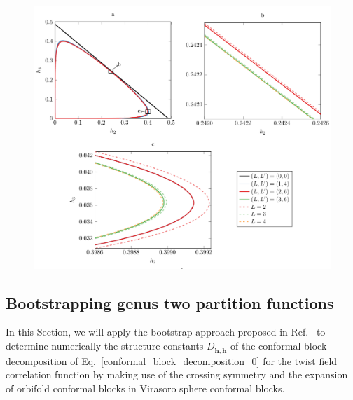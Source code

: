 \documentclass[a4paper,11pt]{article}
\begin{document}
\begin{figure}[t]
 \centering 
 \includegraphics[width=\textwidth]{constraints_strt.pdf}
\caption{}\label{fig:constraints_strt}
\end{figure}

\subsection{Bootstrapping genus two partition functions}


In this Section, we will apply the bootstrap approach proposed in Ref.~\cite{SR} 
to determine numerically the structure constants $D_{\boldsymbol{h}, \boldsymbol{\bar{h}}}$ of the conformal block decomposition 
of Eq.~\eqref{conformal_block_decomposition_0} for the twist field correlation function by making use of 
the crossing symmetry and the expansion of orbifold conformal blocks 
in Virasoro sphere conformal blocks.
\end{document}
